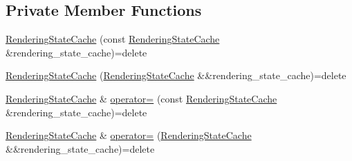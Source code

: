 \subsection*{Private Member Functions}
\begin{DoxyCompactItemize}
\item 
\hyperlink{structmage_1_1_rendering_state_cache_a47c0f5527ce10ca9b6a059946efda239}{Rendering\+State\+Cache} (const \hyperlink{structmage_1_1_rendering_state_cache}{Rendering\+State\+Cache} \&rendering\+\_\+state\+\_\+cache)=delete
\item 
\hyperlink{structmage_1_1_rendering_state_cache_a989dc7c2eebd72a1d90b31e648869b66}{Rendering\+State\+Cache} (\hyperlink{structmage_1_1_rendering_state_cache}{Rendering\+State\+Cache} \&\&rendering\+\_\+state\+\_\+cache)=delete
\item 
\hyperlink{structmage_1_1_rendering_state_cache}{Rendering\+State\+Cache} \& \hyperlink{structmage_1_1_rendering_state_cache_a9534ceabde1d3f9f318f90d2ceec7646}{operator=} (const \hyperlink{structmage_1_1_rendering_state_cache}{Rendering\+State\+Cache} \&rendering\+\_\+state\+\_\+cache)=delete
\item 
\hyperlink{structmage_1_1_rendering_state_cache}{Rendering\+State\+Cache} \& \hyperlink{structmage_1_1_rendering_state_cache_aac885d9a83e196299ac896b3847f471b}{operator=} (\hyperlink{structmage_1_1_rendering_state_cache}{Rendering\+State\+Cache} \&\&rendering\+\_\+state\+\_\+cache)=delete
\end{DoxyCompactItemize}
